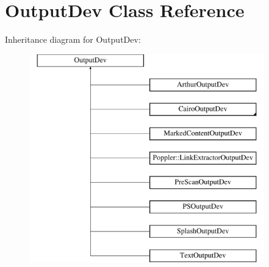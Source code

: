 \hypertarget{class_output_dev}{}\section{Output\+Dev Class Reference}
\label{class_output_dev}
Inheritance diagram for Output\+Dev\+:\begin{figure}[H]
\begin{center}
\leavevmode
\includegraphics[height=9.000000cm]{class_output_dev}
\end{center}
\end{figure}
